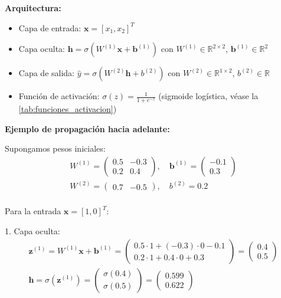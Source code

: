 \textbf{Arquitectura:}
\begin{itemize}
	\item Capa de entrada: \(\mathbf{x} = [x_1, x_2]^T\)
	\item Capa oculta: \(\mathbf{h} = \sigma(W^{(1)}\mathbf{x} + \mathbf{b}^{(1)})\) con \(W^{(1)} \in \mathbb{R}^{2 \times 2}\), \(\mathbf{b}^{(1)} \in \mathbb{R}^2\)
	\item Capa de salida: \(\hat{y} = \sigma(W^{(2)}\mathbf{h} + b^{(2)})\) con \(W^{(2)} \in \mathbb{R}^{1 \times 2}\), \(b^{(2)} \in \mathbb{R}\)
	\item Función de activación: \(\sigma(z) = \frac{1}{1 + e^{-z}}\) (sigmoide logística, véase la \autoref{tab:funciones_activacion})
\end{itemize}

\textbf{Ejemplo de propagación hacia adelante:}

Supongamos pesos iniciales:
\begin{gather*}
    W^{(1)} = \begin{pmatrix}
		          0.5 & -0.3 \\
		          0.2 & 0.4
	\end{pmatrix}, \quad
	\mathbf{b}^{(1)} = \begin{pmatrix}
		                   -0.1 \\
		                   0.3
	\end{pmatrix}\\
    W^{(2)} = \begin{pmatrix}
		          0.7 & -0.5
	\end{pmatrix}, \quad
	b^{(2)} = 0.2\\
\end{gather*}

Para la entrada \(\mathbf{x} = [1, 0]^T\):

1. Capa oculta:
\begin{gather*}
    \mathbf{z}^{(1)} = W^{(1)}\mathbf{x} + \mathbf{b}^{(1)} = \begin{pmatrix}
		                                                          0.5 \cdot 1 + (-0.3) \cdot 0 - 0.1 \\
		                                                          0.2 \cdot 1 + 0.4 \cdot 0 + 0.3
	\end{pmatrix} = \begin{pmatrix}
		                0.4 \\
		                0.5
	\end{pmatrix}\\
    \mathbf{h} = \sigma(\mathbf{z}^{(1)}) = \begin{pmatrix}
		                                        \sigma(0.4) \\
		                                        \sigma(0.5)
	\end{pmatrix} = \begin{pmatrix}
		                0.599 \\
		                0.622
	\end{pmatrix}\\
\end{gather*}


